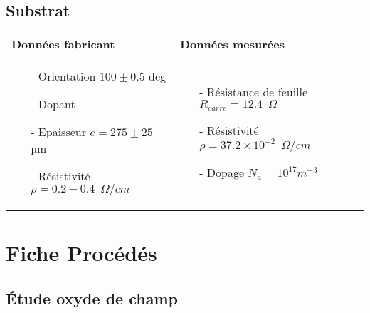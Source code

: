 \documentclass[11pt]{article}
\begin{document}
\subsection{Substrat}
\begin{center}
    \noindent \begin{tabular}[!htb]{ | p{7cm} | p{7cm} |}
    \hline
    \textbf{Donn\'ees fabricant} & \textbf{Donn\'ees mesur\'ees} \\
    \begin{itemize}
    	\item[-] Orientation $100 \pm 0.5$ deg
    	\item[-] Dopant
    	\item[-] Epaisseur $e = 275 \pm 25$ µm
    	\item[-] R\'esistivit\'e $\rho = 0.2 - 0.4 \phantom{2} \Omega/cm$
    \end{itemize}
     &
	\begin{itemize}
    	\item[-] R\'esistance de feuille
    		$R_{carre} = 12.4 \phantom{2} \Omega$
    	\item[-] R\'esistivit\'e $\rho = 37.2 \times 10^{-2}  \phantom{2} \Omega/cm$
    	\item[-] Dopage      $N_a = 10^{17} m^{-3}$
    \end{itemize}
    \\
    \hline
    \end{tabular}
\end{center}

\clearpage

\section{Fiche Proc\'ed\'es}

\subsection{\'Etude oxyde de champ}
\end{document}
